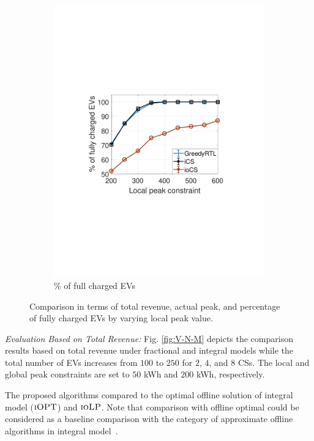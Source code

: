\documentclass[journal]{IEEEtran}
\newcommand{\bt}[1]{{\color{blue}#1}}%
\newcommand{\revv}[1]{{\color{black}#1}}%
\newcommand{\bt}[1]{#1}
\newcommand{\iolp}{\textsc{ioLP}\xspace}
\begin{document}
\begin{figure}[t!]
\begin{subfigure}[b]{0.25\textwidth}
\begin{center}
						\includegraphics[width=\textwidth]{acc-c.pdf}
						\caption{\revv{\% of full charged EVs}}
						\label{fig:acc-c}
					\end{center}
				\end{subfigure}%
				\caption{\revv{Comparison in terms of total revenue, actual peak, and percentage of fully charged EVs by varying local peak value}.} 
				\label{fig:peak_local}
			\vspace{-4mm}
			\end{figure}
\textit{\revv{Evaluation Based on Total Revenue}:}
\revv{Fig. \ref{fig:V-N-M} depicts the comparison results based on total revenue under fractional and integral models} while the total number of EVs increases from \revv{$100$ to $250$} for $2$, $4$, and $8$ CSs. \revv{The local and global peak constraints are set to $50$ kWh and $200$ kWh, respectively.}

The proposed algorithms compared to the optimal offline solution of integral model ($\textsc{iOPT}$) and $\iolp$. \bt{Note that comparison with offline optimal could be considered as a baseline comparison with the category of approximate offline algorithms in integral model~\cite{yao2016real}.}
\end{document}
